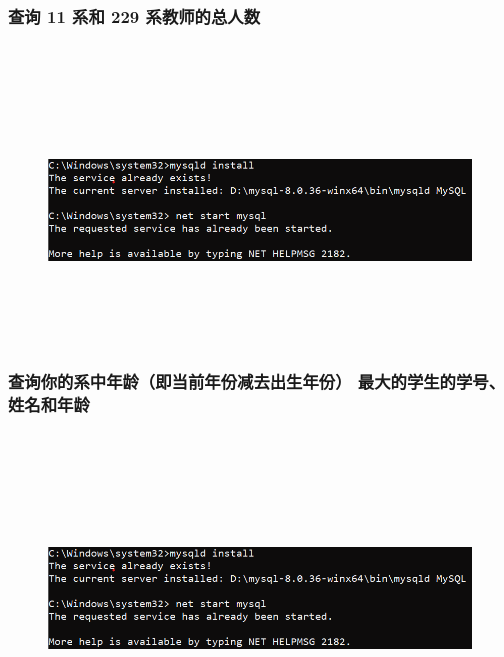 \documentclass{ctexart}
\begin{document}
\subsubsection{查询 11 系和 229 系教师的总人数}
\begin{lstlisting}[language=sql]
	
\end{lstlisting}
\begin{figure}[H]
	\centering 
	\includegraphics[height=7cm,width=14cm]{1.png}
	\end{figure}
\subsubsection{查询你的系中年龄（即当前年份减去出生年份） 最大的学生的学号、姓名和年龄}
\begin{lstlisting}[language=sql]
	
\end{lstlisting}
\begin{figure}[H]
	\centering 
	\includegraphics[height=7cm,width=14cm]{1.png}
	\end{figure}
\end{document}
